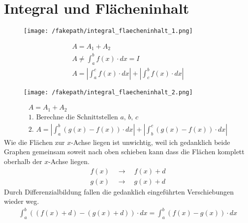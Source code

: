 \section{Integral und Flächeninhalt}
\begin{figure}[H]
  \centering
  \texttt{[image: /fakepath/integral\_flaecheninhalt\_1.png]}
\end{figure}
\begin{gather*}
  A = A_1 + A_2 \\
  A \neq \int_a^b f(x) \cdot dx = I \\
  A = |\int_a^c f(x) \cdot dx| + |\int_c^b f(x) \cdot dx|
\end{gather*}
\begin{figure}[H]
  \centering
  \texttt{[image: /fakepath/integral\_flaecheninhalt\_2.png]}
\end{figure}
\begin{gather*}
  A = A_1 + A_2 \\
  \text{1. Berechne die Schnittstellen $a$, $b$, $c$} \\
  \text{2. } A = |\int_a^b (g(x) - f(x)) \cdot dx| + |\int_b^c (g(x) - f(x)) \cdot dx|
\end{gather*}
Wie die Flächen zur $x$-Achse liegen ist unwichtig, weil ich gedanklich beide Graphen gemeinsam soweit nach oben schieben kann dass die Flächen komplett oberhalb der $x$-Achse liegen.
\begin{gather*}
  f(x) \quad\longrightarrow\quad f(x) + d \\
  g(x) \quad\longrightarrow\quad g(x) + d
\end{gather*}
Durch Differenzialbildung fallen die gedanklich eingeführten Verschiebungen wieder weg.
\begin{gather*}
  \int_a^b ((f(x) + d) - (g(x) + d)) \cdot dx = \int_a^b (f(x) - g(x)) \cdot dx
\end{gather*}
